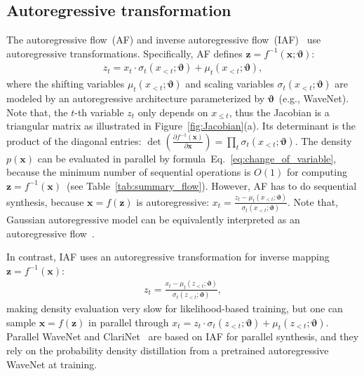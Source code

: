 \documentclass{article}
\newcommand{\vv}[1]{\boldsymbol{#1}}
\begin{document}
\subsection{Autoregressive transformation}
\vspace{-.1em}
The autoregressive flow~(AF) and inverse autoregressive flow~(IAF)~\citep{kingma2016improved, papamakarios2017masked} use autoregressive transformations.
Specifically, AF defines $\vv z = f^{-1}(\vv x; \vv\vartheta)$:
\begin{align}
\label{eq:af_inverse_transform}
z_t =  x_t \cdot \sigma_t (x_{<t}; \vv\vartheta) + 
\mu_t (x_{<t}; \vv\vartheta),
\end{align}
where the shifting variables $\mu_t (x_{<t}; \vv\vartheta)$ and scaling variables $\sigma_t (x_{<t}; \vv\vartheta)$ are modeled by an autoregressive architecture parameterized by $\vv\vartheta$~(e.g., WaveNet).
Note that, the $t$-th variable $z_t$ only depends on $x_{\leq t}$, thus the Jacobian is a triangular matrix as illustrated in Figure~\ref{fig:Jacobian}(a). Its determinant is the product of the diagonal entries: $\det\left( \frac{\partial f^{-1}(\vv x) }{\partial \vv x} \right) = \prod_{t} \sigma_t (x_{<t}; \vv\vartheta)$.
The density $p(\vv x)$ can be evaluated in parallel by  formula~Eq.~\eqref{eq:change_of_variable}, because the minimum number of sequential operations is $O(1)$ for computing $\vv z = f^{-1}(\vv x)$~(see Table~\ref{tab:summary_flow}). 
However, AF has to do sequential synthesis, because  $\vv x = f(\vv z)$ is autoregressive: 
$
x_t =  \frac{z_t - \mu_t (x_{<t}; \vv\vartheta)}{\sigma_t (x_{<t}; \vv\vartheta)}.
$
Note that, Gaussian autoregressive model can be equivalently interpreted as an autoregressive flow~\citep{kingma2016improved}.

In contrast, IAF uses an autoregressive transformation for inverse mapping $\vv z = f^{-1}(\vv x)$:
\begin{align}
\label{eq:iaf_inverse_transform}
z_t =  \frac{x_t - \mu_t (z_{<t}; \vv\vartheta)}{\sigma_t (z_{<t}; \vv\vartheta)},
\end{align}
making density evaluation very slow for likelihood-based training, but one can sample $\vv x = f(\vv z)$ in parallel through
$x_t =  z_t \cdot \sigma_t (z_{<t}; \vv\vartheta) + 
\mu_t (z_{<t}; \vv\vartheta)$.
Parallel WaveNet \citep{oord2017parallel} and ClariNet~\citep{ping2018clarinet} are based on IAF for parallel synthesis, and they rely on the probability density distillation from a pretrained autoregressive WaveNet at training. 
\end{document}
